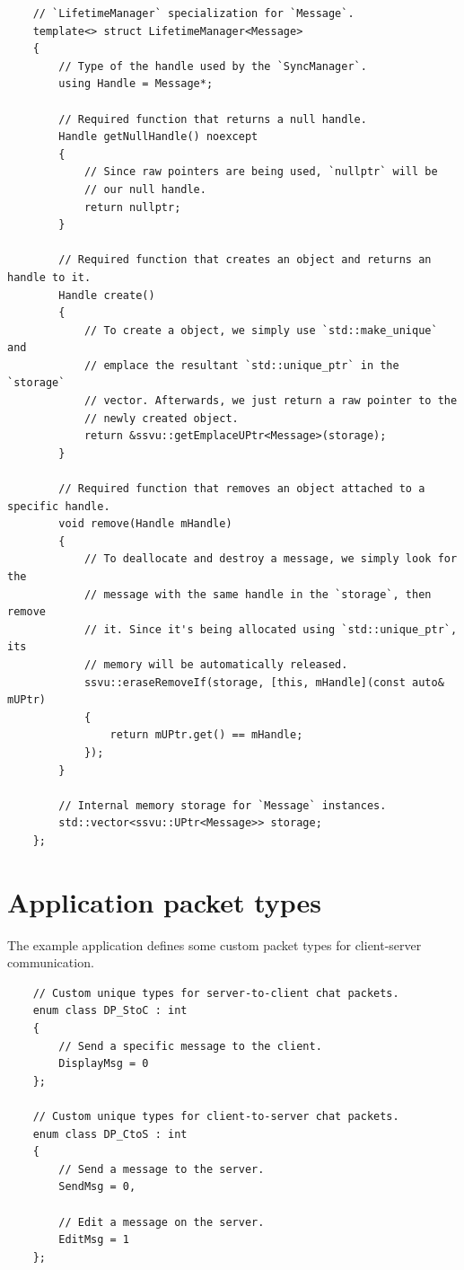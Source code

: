 \documentclass{report}
\def \cppStart {\begin{verbatim}}
\begin{document}
\cppStart
    // `LifetimeManager` specialization for `Message`.
    template<> struct LifetimeManager<Message>
    {
        // Type of the handle used by the `SyncManager`.
        using Handle = Message*;

        // Required function that returns a null handle.
        Handle getNullHandle() noexcept 
        { 
            // Since raw pointers are being used, `nullptr` will be
            // our null handle.
            return nullptr; 
        }

        // Required function that creates an object and returns an handle to it.
        Handle create()
        {
            // To create a object, we simply use `std::make_unique` and
            // emplace the resultant `std::unique_ptr` in the `storage`
            // vector. Afterwards, we just return a raw pointer to the
            // newly created object.
            return &ssvu::getEmplaceUPtr<Message>(storage);
        }

        // Required function that removes an object attached to a specific handle.
        void remove(Handle mHandle)
        {
            // To deallocate and destroy a message, we simply look for the
            // message with the same handle in the `storage`, then remove 
            // it. Since it's being allocated using `std::unique_ptr`, its
            // memory will be automatically released.
            ssvu::eraseRemoveIf(storage, [this, mHandle](const auto& mUPtr)
            {
                return mUPtr.get() == mHandle;
            });
        }
        
        // Internal memory storage for `Message` instances.
        std::vector<ssvu::UPtr<Message>> storage;
    };
\end{verbatim}        

        \section{Application packet types}

            The example application defines some custom packet types for client-server communication.

\cppStart
    // Custom unique types for server-to-client chat packets.
    enum class DP_StoC : int
    {
        // Send a specific message to the client.
        DisplayMsg = 0
    };

    // Custom unique types for client-to-server chat packets.
    enum class DP_CtoS : int
    {
        // Send a message to the server.
        SendMsg = 0,

        // Edit a message on the server.
        EditMsg = 1
    };
\end{verbatim}        
\end{document}
